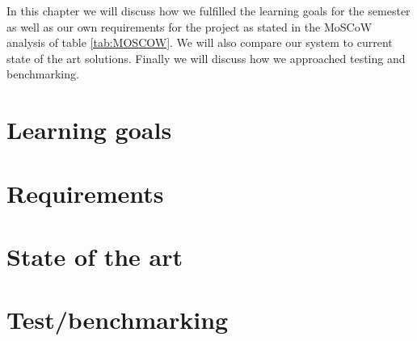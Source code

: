 In this chapter we will discuss how we fulfilled the learning goals for the semester as well as our own requirements for the project as stated in the MoSCoW analysis of table \ref{tab:MOSCOW}. We will also compare our system to current state of the art solutions. Finally we will discuss how we approached testing and benchmarking.

\section{Learning goals}

\section{Requirements}

\section{State of the art}

\section{Test/benchmarking}


